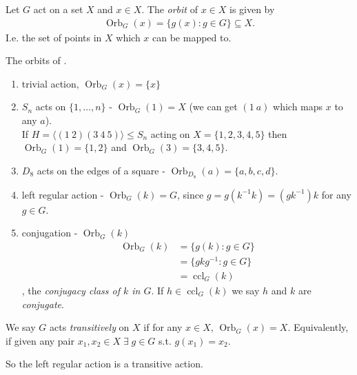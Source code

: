 \begin{definition}[Orbit] \label{def:17}
    Let $G$ act on a set $X$ and $x \in X$.
    The \emph{orbit} of $x \in X$ is given by 
    \begin{align*}
        \operatorname{Orb}_G (x) = \{g(x) : g \in G \} \subseteq X.
    \end{align*} 
    I.e. the set of points in $X$ which $x$ can be mapped to.
\end{definition} 

\begin{example} \mbox{}
    The orbits of .
    \begin{enumerate}
        \item trivial action, $\operatorname{Orb}_G (x) = \{ x \}$
        \item $S_n$ acts on $\{1, \ldots, n\}$ - $\operatorname{Orb}_G(1) = X$ (we can get $(1\ a)$ which maps $x$ to any $a$). \\
        If $H = \langle (1\ 2) (3\ 4\ 5) \rangle \leq S_n$ acting on $X = \{ 1, 2, 3, 4, 5\}$ then $\operatorname{Orb}_G(1) = \{1, 2\}$ and $\operatorname{Orb}_G(3) = \{3, 4, 5\}$.
        \item $D_8$ acts on the edges of a square - $\operatorname{Orb}_{D_8}(a) = \{a, b, c, d\}$.
        \item left regular action - $\operatorname{Orb}_G(k) = G$, since $g = g(k^{-1}k) = (gk^{-1})k$ for any $g \in G$.
        \item conjugation - $\operatorname{Orb}_G(k)$
        \begin{align*}
            \operatorname{Orb}_G(k) &= \{g(k) : g \in G\} \\
            &= \{ gkg^{-1} : g \in G \} \\
            &= \operatorname{ccl}_G(k)
        \end{align*}, the \emph{conjugacy class of $k$ in $G$}. If $h \in \operatorname{ccl}_G(k)$ we say $h$ and $k$ are \emph{conjugate}.
    \end{enumerate} 
\end{example} 

\begin{definition} \label{def:18}
    We say $G$ acts \emph{transitively} on $X$ if for any $x \in X$, $\operatorname{Orb}_G(x) = X$.
    Equivalently, if given any pair $x_1, x_2 \in X \; \exists \; g \in G$ s.t. $g(x_1) = x_2$.

    So the left regular action is a transitive action.
\end{definition} 

